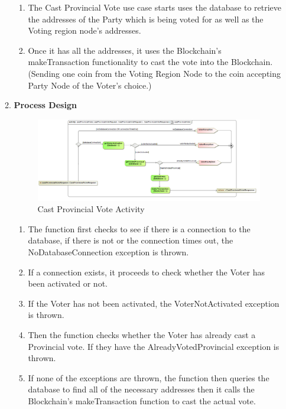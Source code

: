 \begin{enumerate}
\begin{enumerate}
		\begin{enumerate}
			\item The Cast Provincial Vote use case starts uses the database to retrieve the addresses of the Party which is being voted for as well as the Voting region node's addresses.   
			\item Once it has all the addresses, it uses the Blockchain's makeTransaction functionality to cast the vote into the Blockchain. (Sending one coin from the Voting Region Node to the coin accepting Party Node of the Voter's choice.) 
		\end{enumerate}
		
		\newpage
		
		\item \textbf{Process Design}
		\begin{figure}[H]
			\centering
			\includegraphics[width=0.75\linewidth]{../Images/Voter/ActivityDiagrams/castProvincialVote_activity.png}
			\caption{Cast Provincial Vote Activity}
		\end{figure}
		
		\begin{enumerate}
			\item The function first checks to see if there is a connection to the database, if there is not or the connection times out, the NoDatabaseConnection exception is thrown. 
			\item If a connection exists, it proceeds to check whether the Voter has been activated or not. 
			\item If the Voter has not been activated, the VoterNotActivated exception is thrown. 
			\item Then the function checks whether the Voter has already cast a Provincial vote. If they have the AlreadyVotedProvincial exception is thrown.
			\item If none of the exceptions are thrown, the function then queries the database to find all of the necessary addresses then it calls the Blockchain's makeTransaction function to cast the actual vote.  
			
		\end{enumerate}
	\end{enumerate}
\end{enumerate}









